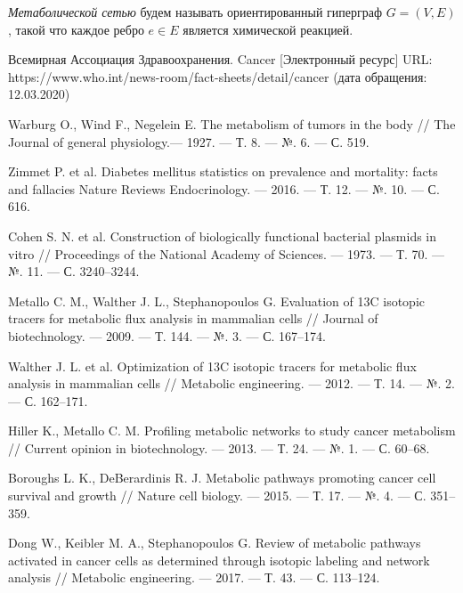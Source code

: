 \documentclass[14pt, a4paper]{extreport}
\begin{document}
\begin{appendices}
	\emph{Метаболической сетью} будем называть ориентированный гиперграф $G = (V, E)$, такой что каждое ребро $e \in E$ является химической реакцией.
\end{appendices}

\cleardoublepage
{}
{}
\renewcommand{\bibname}{Список литературы}
\begin{thebibliography}{XXXX}
	Всемирная Ассоциация Здравоохранения. Cancer [Электронный ресурс] URL: https://www.who.int/news-room/fact-sheets/detail/cancer (дата обращения: 12.03.2020)
	
	Warburg O., Wind F., Negelein E. The metabolism of tumors in the body // The Journal of general physiology.--- 1927. --- Т. 8. --- №. 6. --- С. 519.
	
	Zimmet P. et al. Diabetes mellitus statistics on prevalence and mortality: facts and fallacies Nature Reviews Endocrinology. --- 2016. --- Т. 12. --- №. 10. --- С. 616.
	
	Cohen S. N. et al. Construction of biologically functional bacterial plasmids in vitro // Proceedings of the National Academy of Sciences. --- 1973. --- Т. 70. --- №. 11. --- С. 3240--3244.
	
	Metallo C. M., Walther J. L., Stephanopoulos G. Evaluation of 13C isotopic tracers for metabolic flux analysis in mammalian cells // Journal of biotechnology. --- 2009. --- Т. 144. --- №. 3. --- С. 167--174.
	
	Walther J. L. et al. Optimization of 13C isotopic tracers for metabolic flux analysis in mammalian cells // Metabolic engineering. --- 2012. --- Т. 14. --- №. 2. --- С. 162--171.
	
	Hiller K., Metallo C. M. Profiling metabolic networks to study cancer metabolism // Current opinion in biotechnology. --- 2013. --- Т. 24. --- №. 1. --- С. 60--68.
	
	Boroughs L. K., DeBerardinis R. J. Metabolic pathways promoting cancer cell survival and growth // Nature cell biology. --- 2015. --- Т. 17. --- №. 4. --- С. 351--359.
	
	Dong W., Keibler M. A., Stephanopoulos G. Review of metabolic pathways activated in cancer cells as determined through isotopic labeling and network analysis // Metabolic engineering. --- 2017. --- Т. 43. --- С. 113--124.
	

\end{thebibliography}
\end{document}
